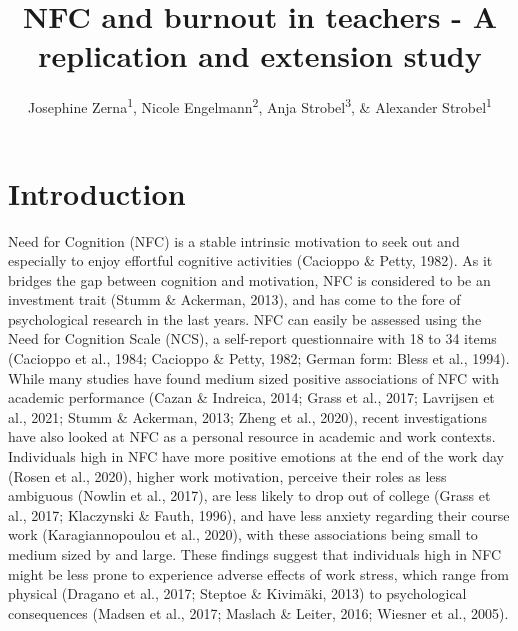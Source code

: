 \documentclass[
  english,
  man,floatsintext]{apa6}
\title{NFC and burnout in teachers - A replication and extension study}
\author{Josephine Zerna\textsuperscript{1}, Nicole Engelmann\textsuperscript{2}, Anja Strobel\textsuperscript{3}, \& Alexander Strobel\textsuperscript{1}}
\date{}
\affiliation{\vspace{0.5cm}\textsuperscript{1} Faculty of Psychology, Technische Universität Dresden\\\textsuperscript{2} Faculty of Education, Technische Universität Dresden\\\textsuperscript{3} Institute of Psychology, Chemnitz University of Technology}
\begin{document}
\maketitle

\renewcommand\thesection{\Alph{section}}
\setcounter{figure}{0}
\setcounter{table}{0}

\hypertarget{introduction}{%
\section{Introduction}\label{introduction}}

Need for Cognition (NFC) is a stable intrinsic motivation to seek out and especially to enjoy effortful cognitive activities (Cacioppo \& Petty, 1982).
As it bridges the gap between cognition and motivation, NFC is considered to be an investment trait (Stumm \& Ackerman, 2013), and has come to the fore of psychological research in the last years.
NFC can easily be assessed using the Need for Cognition Scale (NCS), a self-report questionnaire with 18 to 34 items (Cacioppo et al., 1984; Cacioppo \& Petty, 1982; German form: Bless et al., 1994).
While many studies have found medium sized positive associations of NFC with academic performance (Cazan \& Indreica, 2014; Grass et al., 2017; Lavrijsen et al., 2021; Stumm \& Ackerman, 2013; Zheng et al., 2020), recent investigations have also looked at NFC as a personal resource in academic and work contexts.
Individuals high in NFC have more positive emotions at the end of the work day (Rosen et al., 2020), higher work motivation, perceive their roles as less ambiguous (Nowlin et al., 2017), are less likely to drop out of college (Grass et al., 2017; Klaczynski \& Fauth, 1996), and have less anxiety regarding their course work (Karagiannopoulou et al., 2020), with these associations being small to medium sized by and large.
These findings suggest that individuals high in NFC might be less prone to experience adverse effects of work stress, which range from physical (Dragano et al., 2017; Steptoe \& Kivimäki, 2013) to psychological consequences (Madsen et al., 2017; Maslach \& Leiter, 2016; Wiesner et al., 2005).
\end{document}
